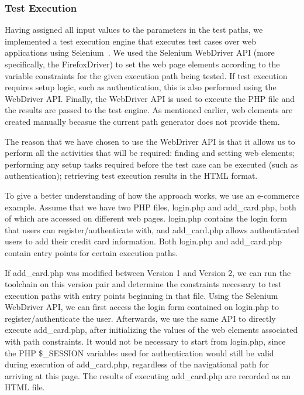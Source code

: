 \subsubsection{Test Execution}

Having assigned all input values to the parameters in the test 
paths, we implemented a test execution engine that executes
test cases over web applications using Selenium~\cite{selenium}.
We used the Selenium WebDriver API (more specifically, the FirefoxDriver) 
to set the web page elements according to the variable constraints for 
the given execution path being tested. If test execution requires setup 
logic, such as authentication, this is also performed using the WebDriver 
API. Finally, the WebDriver API is used to execute the PHP file and the 
results are passed to the test engine.
As mentioned earlier, web elements are created manually becasue the current 
path generator does not provide them.

The reason that we have chosen to use the WebDriver API is that it allows us 
to perform all the activities that will be required: finding and setting web 
elements; performing any setup tasks required before the test case can be 
executed (such as authentication); retrieving test execution results in the 
HTML format.

To give a better understanding of how the approach works, we use an e-commerce 
example. Assume that we have two PHP files, login.php and add\_card.php, both 
of which are accessed on different web pages. login.php contains the login 
form that users can register/authenticate with, and add\_card.php allows 
authenticated users to add their credit card information. Both login.php 
and add\_card.php contain entry points for certain execution paths.

If add\_card.php was modified between Version 1 and Version 2, we can run 
the toolchain on this version pair and determine the constraints necessary 
to test execution paths with entry points beginning in that file. Using 
the Selenium WebDriver API, we can first access the login form contained 
on login.php to register/authenticate the user. Afterwards, we use the 
same API to directly execute add\_card.php, after initializing the values 
of the web elements associated with path constraints. It would not be 
necessary to start from login.php, since the PHP \$\_SESSION variables 
used for authentication would still be valid during execution of add\_card.php, 
regardless of the navigational path for arriving at this page. The results 
of executing add\_card.php are recorded as an HTML file.



